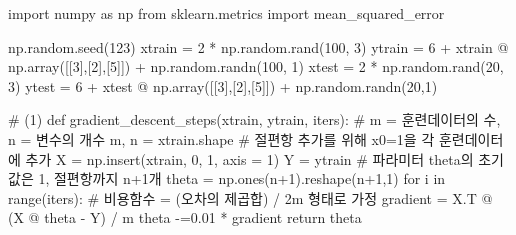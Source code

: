 \documentclass[
  letterpaper,
  DIV=11,
  numbers=noendperiod]{scrartcl}
\newenvironment{Shaded}{\begin{snugshade}}{\end{snugshade}}
\newcommand{\BuiltInTok}[1]{\textcolor[rgb]{0.00,0.23,0.31}{#1}}
\newcommand{\CommentTok}[1]{\textcolor[rgb]{0.37,0.37,0.37}{#1}}
\newcommand{\ControlFlowTok}[1]{\textcolor[rgb]{0.00,0.23,0.31}{#1}}
\newcommand{\DecValTok}[1]{\textcolor[rgb]{0.68,0.00,0.00}{#1}}
\newcommand{\FloatTok}[1]{\textcolor[rgb]{0.68,0.00,0.00}{#1}}
\newcommand{\ImportTok}[1]{\textcolor[rgb]{0.00,0.46,0.62}{#1}}
\newcommand{\KeywordTok}[1]{\textcolor[rgb]{0.00,0.23,0.31}{#1}}
\newcommand{\NormalTok}[1]{\textcolor[rgb]{0.00,0.23,0.31}{#1}}
\newcommand{\OperatorTok}[1]{\textcolor[rgb]{0.37,0.37,0.37}{#1}}
\begin{document}
\begin{Shaded}
\begin{Highlighting}[]
\ImportTok{import}\NormalTok{ numpy }\ImportTok{as}\NormalTok{ np}
\ImportTok{from}\NormalTok{ sklearn.metrics }\ImportTok{import}\NormalTok{ mean\_squared\_error}

\NormalTok{np.random.seed(}\DecValTok{123}\NormalTok{)}
\NormalTok{xtrain }\OperatorTok{=} \DecValTok{2} \OperatorTok{*}\NormalTok{ np.random.rand(}\DecValTok{100}\NormalTok{, }\DecValTok{3}\NormalTok{)}
\NormalTok{ytrain }\OperatorTok{=} \DecValTok{6} \OperatorTok{+}\NormalTok{ xtrain }\OperatorTok{@}\NormalTok{ np.array([[}\DecValTok{3}\NormalTok{],[}\DecValTok{2}\NormalTok{],[}\DecValTok{5}\NormalTok{]]) }\OperatorTok{+}\NormalTok{ np.random.randn(}\DecValTok{100}\NormalTok{, }\DecValTok{1}\NormalTok{)}
\NormalTok{xtest }\OperatorTok{=} \DecValTok{2} \OperatorTok{*}\NormalTok{ np.random.rand(}\DecValTok{20}\NormalTok{, }\DecValTok{3}\NormalTok{)}
\NormalTok{ytest }\OperatorTok{=} \DecValTok{6} \OperatorTok{+}\NormalTok{ xtest }\OperatorTok{@}\NormalTok{ np.array([[}\DecValTok{3}\NormalTok{],[}\DecValTok{2}\NormalTok{],[}\DecValTok{5}\NormalTok{]]) }\OperatorTok{+}\NormalTok{ np.random.randn(}\DecValTok{20}\NormalTok{,}\DecValTok{1}\NormalTok{)}

\CommentTok{\# (1)}
\KeywordTok{def}\NormalTok{ gradient\_descent\_steps(xtrain, ytrain, iters):}
    \CommentTok{\# m = 훈련데이터의 수, n = 변수의 개수}
\NormalTok{    m, n }\OperatorTok{=}\NormalTok{ xtrain.shape}
    \CommentTok{\# 절편항 추가를 위해 x0=1을 각 훈련데이터에 추가}
\NormalTok{    X }\OperatorTok{=}\NormalTok{ np.insert(xtrain, }\DecValTok{0}\NormalTok{, }\DecValTok{1}\NormalTok{, axis }\OperatorTok{=} \DecValTok{1}\NormalTok{)}
\NormalTok{    Y }\OperatorTok{=}\NormalTok{ ytrain}
    \CommentTok{\# 파라미터 theta의 초기값은 1, 절편항까지 n+1개 }
\NormalTok{    theta }\OperatorTok{=}\NormalTok{ np.ones(n}\OperatorTok{+}\DecValTok{1}\NormalTok{).reshape(n}\OperatorTok{+}\DecValTok{1}\NormalTok{,}\DecValTok{1}\NormalTok{)}
    \ControlFlowTok{for}\NormalTok{ i }\KeywordTok{in} \BuiltInTok{range}\NormalTok{(iters):}
        \CommentTok{\# 비용함수 = (오차의 제곱합) / 2m 형태로 가정 }
\NormalTok{        gradient }\OperatorTok{=}\NormalTok{ X.T }\OperatorTok{@}\NormalTok{ (X }\OperatorTok{@}\NormalTok{ theta }\OperatorTok{{-}}\NormalTok{ Y) }\OperatorTok{/}\NormalTok{ m}
\NormalTok{        theta }\OperatorTok{{-}=}\FloatTok{0.01} \OperatorTok{*}\NormalTok{ gradient}
    \ControlFlowTok{return}\NormalTok{ theta}


\end{Highlighting}
\end{Shaded}
\end{document}
